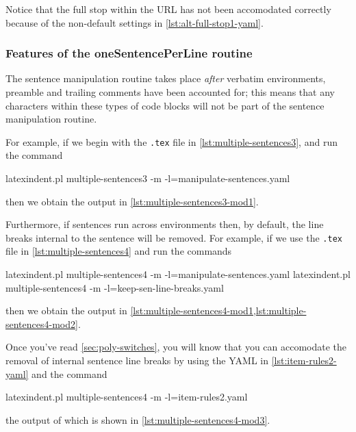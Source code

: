 	Notice that the full stop within the URL has not been accomodated correctly because of
	the non-default settings in \cref{lst:alt-full-stop1-yaml}.

\subsubsection{Features of the oneSentencePerLine routine}
	The sentence manipulation routine takes place \emph{after} verbatim
	environments, preamble and trailing comments have been accounted for; this means that any
	characters within these types of code blocks will not be part of the sentence
	manipulation routine.

	For example, if we begin with the \texttt{.tex} file in
	\cref{lst:multiple-sentences3}, and run the command
	\begin{commandshell}
latexindent.pl multiple-sentences3 -m -l=manipulate-sentences.yaml
	\end{commandshell}
	then we obtain the output in \cref{lst:multiple-sentences3-mod1}. 

	Furthermore, if sentences run across environments then, by default, the line breaks
	internal to the sentence will be removed. For example, if we use the
	\texttt{.tex} file in \cref{lst:multiple-sentences4} and run the commands
	\begin{commandshell}
latexindent.pl multiple-sentences4 -m -l=manipulate-sentences.yaml
latexindent.pl multiple-sentences4 -m -l=keep-sen-line-breaks.yaml
	\end{commandshell}
	then we obtain the output in \cref{lst:multiple-sentences4-mod1,lst:multiple-sentences4-mod2}. 
	\begin{widepage}
	\end{widepage}
	Once you've read \cref{sec:poly-switches}, you will know that you can accomodate the
	removal of internal sentence line breaks by using the YAML in \cref{lst:item-rules2-yaml}
	and the command
	\begin{commandshell}
latexindent.pl multiple-sentences4 -m -l=item-rules2.yaml
	\end{commandshell}
	the output of which is shown in \cref{lst:multiple-sentences4-mod3}.

